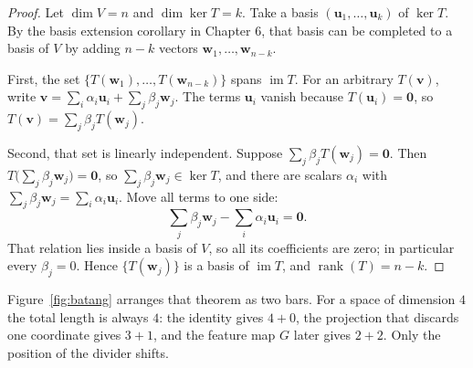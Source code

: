 \begin{proof}
Let $\dim V=n$ and $\dim\ker T=k$. Take a basis
$(\mathbf{u}_{1},\dots,\mathbf{u}_{k})$ of $\ker T$. By the basis extension corollary in Chapter 6,
that basis can be completed to a basis of $V$ by adding $n-k$ vectors
$\mathbf{w}_{1},\dots,\mathbf{w}_{n-k}$.

First, the set $\{T(\mathbf{w}_{1}),\dots,T(\mathbf{w}_{n-k})\}$ spans
$\operatorname{im}T$. For an arbitrary $T(\mathbf{v})$, write
$\mathbf{v}=\sum_{i}\alpha_{i}\mathbf{u}_{i}+\sum_{j}\beta_{j}\mathbf{w}_{j}$. The terms
$\mathbf{u}_{i}$ vanish because $T(\mathbf{u}_{i})=\mathbf{0}$, so
$T(\mathbf{v})=\sum_{j}\beta_{j}T(\mathbf{w}_{j})$.

Second, that set is linearly independent. Suppose $\sum_{j}\beta_{j}T(\mathbf{w}_{j})=\mathbf{0}$.
Then $T\bigl(\sum_{j}\beta_{j}\mathbf{w}_{j}\bigr)=\mathbf{0}$, so
$\sum_{j}\beta_{j}\mathbf{w}_{j}\in\ker T$, and there are scalars $\alpha_{i}$ with
$\sum_{j}\beta_{j}\mathbf{w}_{j}=\sum_{i}\alpha_{i}\mathbf{u}_{i}$. Move all terms to
one side:
\[
  \sum_{j}\beta_{j}\mathbf{w}_{j}-\sum_{i}\alpha_{i}\mathbf{u}_{i}=\mathbf{0}.
\]
That relation lies inside a basis of $V$, so all its coefficients are zero; in particular every
$\beta_{j}=0$. Hence $\{T(\mathbf{w}_{j})\}$ is a basis of $\operatorname{im}T$, and
$\operatorname{rank}(T)=n-k$.
\end{proof}

Figure~\ref{fig:batang} arranges that theorem as two bars. For a space of dimension
$4$ the total length is always $4$: the identity gives $4+0$, the projection that discards one
coordinate
gives $3+1$, and the feature map $G$ later gives $2+2$. Only the position of the divider
shifts.


